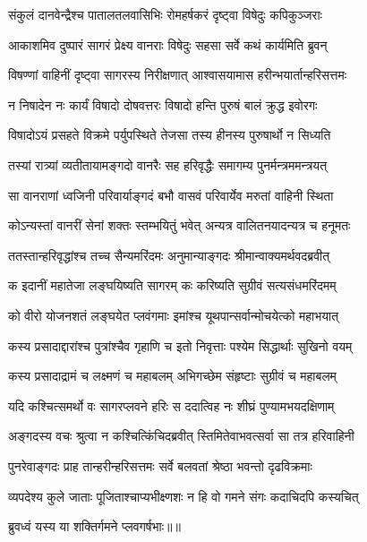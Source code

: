 \twolineshloka
{संकुलं दानवेन्द्रैश्च पातालतलवासिभिः}
{रोमहर्षकरं दृष्ट्वा विषेदुः कपिकुञ्जराः} %

\twolineshloka
{आकाशमिव दुष्पारं सागरं प्रेक्ष्य वानराः}
{विषेदुः सहसा सर्वे कथं कार्यमिति ब्रुवन्} %

\twolineshloka
{विषण्णां वाहिनीं दृष्ट्वा सागरस्य निरीक्षणात्}
{आश्वासयामास हरीन्भयार्तान्हरिसत्तमः} %

\twolineshloka
{न निषादेन नः कार्यं विषादो दोषवत्तरः}
{विषादो हन्ति पुरुषं बालं क्रुद्ध इवोरगः} %

\twolineshloka
{विषादोऽयं प्रसहते विक्रमे पर्युपस्थिते}
{तेजसा तस्य हीनस्य पुरुषार्थो न सिध्यति} %

\twolineshloka
{तस्यां रात्र्यां व्यतीतायामङ्गदो वानरैः सह}
{हरिवृद्धैः समागम्य पुनर्मन्त्रममन्त्रयत्} %

\twolineshloka
{सा वानराणां ध्वजिनी परिवार्याङ्गदं बभौ}
{वासवं परिवार्येव मरुतां वाहिनी स्थिता} %

\twolineshloka
{कोऽन्यस्तां वानरीं सेनां शक्तः स्तम्भयितुं भवेत्}
{अन्यत्र वालितनयादन्यत्र च हनूमतः} %

\twolineshloka
{ततस्तान्हरिवृद्धांश्च तच्च सैन्यमरिंदमः}
{अनुमान्याङ्गदः श्रीमान्वाक्यमर्थवदब्रवीत्} %

\twolineshloka
{क इदानीं महातेजा लङ्घयिष्यति सागरम्}
{कः करिष्यति सुग्रीवं सत्यसंधमरिंदमम्} %

\twolineshloka
{को वीरो योजनशतं लङ्घयेत प्लवंगमाः}
{इमांश्च यूथपान्सर्वान्मोचयेत्को महाभयात्} %

\twolineshloka
{कस्य प्रसादाद्दारांश्च पुत्रांश्चैव गृहाणि च}
{इतो निवृत्ताः पश्येम सिद्धार्थाः सुखिनो वयम्} %

\twolineshloka
{कस्य प्रसादाद्रामं च लक्ष्मणं च महाबलम्}
{अभिगच्छेम संहृष्टाः सुग्रीवं च महाबलम्} %

\twolineshloka
{यदि कश्चित्समर्थो वः सागरप्लवने हरिः}
{स ददात्विह नः शीघ्रं पुण्यामभयदक्षिणाम्} %

\twolineshloka
{अङ्गदस्य वचः श्रुत्वा न कश्चित्किंचिदब्रवीत्}
{स्तिमितेवाभवत्सर्वा सा तत्र हरिवाहिनी} %

\twolineshloka
{पुनरेवाङ्गदः प्राह तान्हरीन्हरिसत्तमः}
{सर्वे बलवतां श्रेष्ठा भवन्तो दृढविक्रमाः} %

\twolineshloka
{व्यपदेश्य कुले जाताः पूजिताश्चाप्यभीक्ष्णशः}
{न हि वो गमने संगः कदाचिदपि कस्यचित्} %

{ब्रुवध्वं यस्य या शक्तिर्गमने प्लवगर्षभाः॥॥} %

